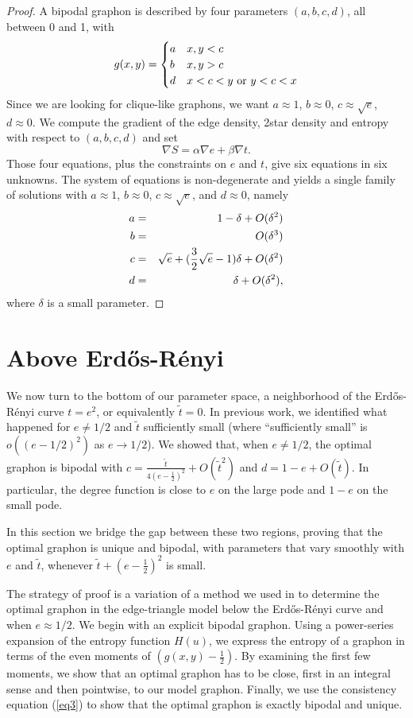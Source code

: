\documentclass[12pt]{amsart}
\newcommand{\1}{\mathbf{1}}
\begin{document}
\begin{proof}
A bipodal graphon is described by four parameters $(a,b,c,d)$, all between 0 and 1, with 
\begin{equation} 
g(x,y) = \begin{cases} a & x,y < c \cr 
b & x,y > c \cr 
d & x<c<y \hbox{ or } y<c<x\end{cases}
\end{equation}
Since we are looking for clique-like graphons, we want $a \approx 1$, $b \approx 0$, $c \approx \sqrt{e}$, $d \approx 0$. 
We compute the gradient of the edge density, 2star density and entropy with respect to $(a,b,c,d)$ and set 
\begin{equation} \nabla S = \alpha \nabla e + \beta \nabla t. \end{equation}
Those four equations, plus the constraints on $e$ and $t$, give six equations in six unknowns. The system of equations is 
non-degenerate and yields a single family of solutions with $a \approx 1$, $b \approx 0$, $c \approx \sqrt{e}$, and 
$d \approx 0$, namely 
\begin{eqnarray}
a & = & 1 - \delta + O(\delta^2) \cr 
b & = & O(\delta^3) \cr 
c & = & \sqrt{e} + (\frac32 \sqrt{e} -1)\delta + O(\delta^2) \cr 
d & = & \delta + O(\delta^2), 
\end{eqnarray}
where $\delta$ is a small parameter. 
\end{proof}

\section{Above Erd\H{o}s-R\'enyi} \label{sec:small}

We now turn to the bottom of our parameter space, a neighborhood of 
the Erd\H{o}s-R\'enyi curve $t=e^2$, or equivalently $\tilde t=0$. In previous work,
we identified what happened for $e \ne 1/2$ and $\tilde t$ sufficiently small
(where ``sufficiently small'' is $o((e-1/2)^2)$ as $e \to 1/2$). 
We showed that, when $e \ne 1/2$, the optimal graphon is 
bipodal with $c = \frac{\tilde t}{4(e-\frac12)^2} + O(\tilde t^2)$ and 
$d=1-e + O(\tilde t)$. In particular, the degree function is close to $e$ on the large 
pode and $1-e$ on the small pode.  

In this section we bridge the gap between these two regions, proving that the
optimal graphon is unique and bipodal, with parameters that vary smoothly with
$e$ and $\tilde t$, whenever $\tilde t + (e-\frac12)^2$ is small. 

The strategy of proof is a variation of a method we used in \cite{NRS4}
to determine the optimal graphon in the edge-triangle model below the
Erd\H{o}s-R\'enyi curve and when $e \approx 1/2$. 
We begin with an explicit bipodal graphon. 
Using a power-series expansion of the entropy function $H(u)$, we express the
entropy of a graphon in terms of the even moments of $(g(x,y) - \frac12)$. 
By examining the first few moments, we show that an optimal graphon has to be 
close, first in an integral sense and then pointwise, to our model graphon. 
Finally, we use the consistency equation (\ref{eq3}) to show that the optimal
graphon is exactly bipodal and unique. 
\end{document}

